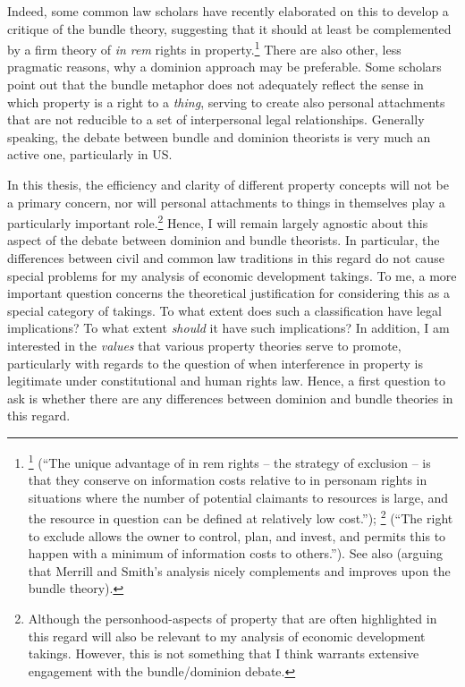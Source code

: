 Indeed, some common law scholars have recently elaborated on this to develop a critique of the bundle theory, suggesting that it should at least be complemented by a firm theory of {\it in rem} rights in property.\footnote{\footcite[793]{merrill01b} (``The unique advantage of in rem rights -- the strategy of exclusion -- is that they conserve on information costs relative to in personam rights in situations where the number of potential claimants to resources is large, and the resource in question can be defined at relatively low cost.''); \footcite[389]{merrill01} (``The right to exclude allows the owner to control, plan, and invest, and permits this to happen with a minimum of information costs to others.''). See also \cite{ellickson11} (arguing that Merrill and Smith's analysis nicely complements and improves upon the bundle theory).} There are also other, less pragmatic reasons, why a dominion approach may be preferable. Some scholars point out that the bundle metaphor does not adequately reflect the sense in which property is a right to a {\it thing}, serving to create also personal attachments that are not reducible to a set of interpersonal legal relationships. Generally speaking, the debate between bundle and dominion theorists is very much an active one, particularly in US. 

In this thesis, the efficiency and clarity of different property concepts will not be a primary concern, nor will personal attachments to things in themselves play a particularly important role.\footnote{Although the personhood-aspects of property that are often highlighted in this regard will also be relevant to my analysis of economic development takings. However, this is not something that I think warrants extensive engagement with the bundle/dominion debate.} Hence, I will remain largely agnostic about this aspect of the debate between dominion and bundle theorists. In particular, the differences between civil and common law traditions in this regard do not cause special problems for my analysis of economic development takings. To me, a more important question concerns the theoretical justification for considering this as a special category of takings. To what extent does such a classification have legal implications? To what extent {\it should} it have such implications? In addition, I am interested in the {\it values} that various property theories serve to promote, particularly with regards to the question of when interference in property is legitimate under constitutional and human rights law. Hence, a first question to ask is whether there are any differences between dominion and bundle theories in this regard.

